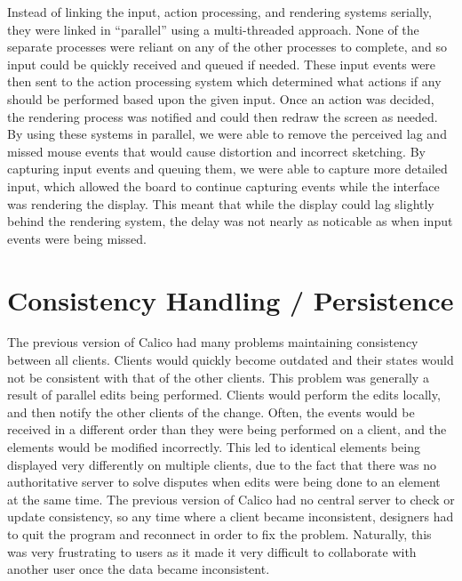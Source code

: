 Instead of linking the input, action processing, and rendering systems serially, they were linked in ``parallel'' using a multi-threaded approach. None of the separate processes were reliant on any of the other processes to complete, and so input could be quickly received and queued if needed. These input events were then sent to the action processing system which determined what actions if any should be performed based upon the given input. Once an action was decided, the rendering process was notified and could then redraw the screen as needed. By using these systems in parallel, we were able to remove the perceived lag and missed mouse events that would cause distortion and incorrect sketching. By capturing input events and queuing them, we were able to capture more detailed input, which allowed the board to continue capturing events while the interface was rendering the display. This meant that while the display could lag slightly behind the rendering system, the delay was not nearly as noticable as when input events were being missed. 


\section{Consistency Handling / Persistence}
The previous version of Calico had many problems maintaining consistency between all clients. Clients would quickly become outdated and their states would not be consistent with that of the other clients. 
This problem was generally a result of parallel edits being performed. Clients would perform the edits locally, and then notify the other clients of the change. Often, the events would be received in a different order than they were being performed on a client, and the elements would be modified incorrectly. This led to identical elements being displayed very differently on multiple clients, due to the fact that there was no authoritative server to solve disputes when edits were being done to an element at the same time.
The previous version of Calico had no central server to check or update consistency, so any time where a client became inconsistent, designers had to quit the program and reconnect in order to fix the problem.
Naturally, this was very frustrating to users as it made it very difficult to collaborate with another user once the data became inconsistent. 

